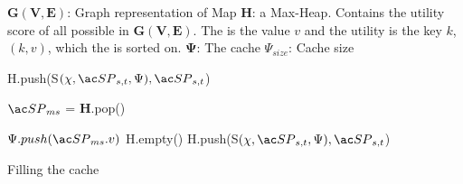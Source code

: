 
\begin{algorithm}[H!bt]
\dontprintsemicolon
\SetVline


\KwData
{

	$\mathbf{G(V,E)}$: Graph representation of Map \;
	\textbf{H}: a Max-Heap. Contains the utility score of all possible \spaths in $\mathbf{G(V,E)}$. The \spath is the value $v$ and the utility is the key $k$, $(k, v)$, which the is sorted on.\;
	$\mathbf{\Psi}$: The cache \;
	$\Psi_{size}$: Cache size \;
}



{
    H.push(S$(\chi, \spath_{s,t}, \Psi), \spath_{s,t}$) \;
}


{
	$\spath_{ms}$ = \textbf{H}.pop() \; 
	{
		$\Psi.push(\spath_{ms}.v)$\;
		H.empty() \;
		{
		    H.push(S$(\chi, \spath_{s,t}, \Psi), \spath_{s,t}$) \;
		}
		
	}
}

\caption{Filling the cache}
\label{alg:greedy}
\end{algorithm}